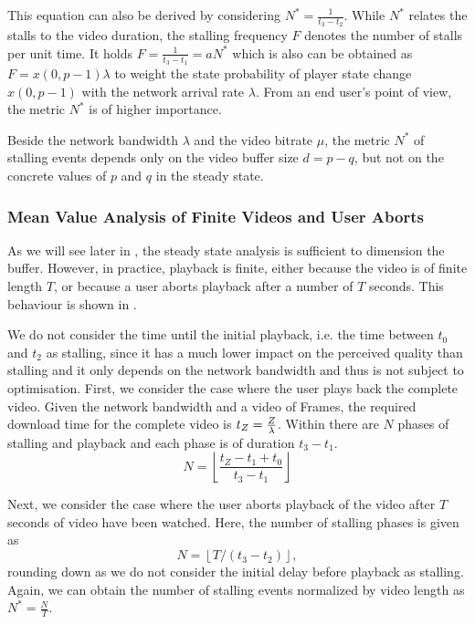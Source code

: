 This equation can also be derived by considering \(N^*=\frac{1}{t_3-t_2}\). 
While \(N^*\) relates the stalls to the video duration, the stalling frequency \(F\) denotes the number of stalls per unit time. 
It holds \(F=\frac{1}{t_3-t_1}=a N^*\) which is also can be obtained as \(F=x(0,p-1) \lambda\) to weight the state probability of player state change \(x(0,p-1)\) with the network arrival rate \(\lambda\). 
From an end user's point of view, the metric $N^*$ is of higher importance. 

Beside the network bandwidth \(\lambda\) and the video bitrate \(\mu\), the metric \(N^*\) of stalling events depends only on the video buffer size \(d=p-q\), but not on the concrete values of \(p\) and \(q\) in the steady state.


\subsubsection*{Mean Value Analysis of Finite Videos and User Aborts}\label{sec:application:qoe_user_behaviour:system_model:finite_video}

As we will see later in , the steady state analysis is sufficient to dimension the buffer. 
However, in practice, playback is finite, either because the video is of finite length \(T\), or because a user aborts playback after a number of \(T\) seconds.
This behaviour is shown in .

We do not consider the time until the initial playback, i.e. the time between \(t_0\) and \(t_2\) as stalling, since it has a much lower impact on the perceived quality than stalling \cite{Garcia2014} and it only depends on the network bandwidth \networkBandwidth and thus is not subject to optimisation.
First, we consider the case where the user plays back the complete video.
Given the network bandwidth \networkBandwidth and a video of \numberFrames Frames, the required download time for the complete video is \(t_Z = \frac{Z}{\lambda}\).
Within \videoDownloadTime there are \(N\) phases of stalling and playback and each phase is of duration \(t_3 - t_1\).
\[
N = \left\lfloor \frac{t_Z-t_1+t_0}{t_3-t_1} \right\rfloor 
\]

Next, we consider the case where the user aborts playback of the video after \(T\) seconds of video have been watched.
Here, the number of stalling phases is given as 
\[
N = \left \lfloor{T / (t_3 - t_2)}\right \rfloor,
\]
rounding down as we do not consider the initial delay before playback as stalling.
Again, we can obtain the number of stalling events normalized by video length as
\(N^*=\frac{N}{T}\).